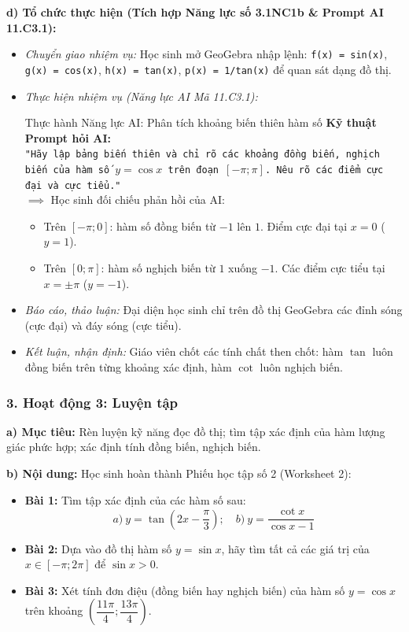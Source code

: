 \documentclass[12pt, a4paper]{article}
\begin{document}
\textbf{d) Tổ chức thực hiện (Tích hợp Năng lực số 3.1NC1b & Prompt AI 11.C3.1):}
\begin{itemize}[leftmargin=0.6cm]
    \item \textit{Chuyển giao nhiệm vụ:} Học sinh mở GeoGebra nhập lệnh: \texttt{f(x) = sin(x)}, \texttt{g(x) = cos(x)}, \texttt{h(x) = tan(x)}, \texttt{p(x) = 1/tan(x)} để quan sát dạng đồ thị.
    \item \textit{Thực hiện nhiệm vụ (Năng lực AI Mã 11.C3.1):}
    \begin{aibox}{Thực hành Năng lực AI: Phân tích khoảng biến thiên hàm số}
        \textbf{Kỹ thuật Prompt hỏi AI:}\\
        \texttt{"Hãy lập bảng biến thiên và chỉ rõ các khoảng đồng biến, nghịch biến của hàm số $y = \cos x$ trên đoạn $[-\pi; \pi]$. Nêu rõ các điểm cực đại và cực tiểu."}\\
        $\implies$ Học sinh đối chiếu phản hồi của AI:
        \begin{itemize}[leftmargin=0.5cm]
            \item Trên $[-\pi; 0]$: hàm số đồng biến từ $-1$ lên $1$. Điểm cực đại tại $x = 0$ ($y = 1$).
            \item Trên $[0; \pi]$: hàm số nghịch biến từ $1$ xuống $-1$. Các điểm cực tiểu tại $x = \pm \pi$ ($y = -1$).
        \end{itemize}
    \end{aibox}
    \item \textit{Báo cáo, thảo luận:} Đại diện học sinh chỉ trên đồ thị GeoGebra các đỉnh sóng (cực đại) và đáy sóng (cực tiểu).
    \item \textit{Kết luận, nhận định:} Giáo viên chốt các tính chất then chốt: hàm $\tan$ luôn đồng biến trên từng khoảng xác định, hàm $\cot$ luôn nghịch biến.
\end{itemize}

\subsubsection*{3. Hoạt động 3: Luyện tập}
\textbf{a) Mục tiêu:} Rèn luyện kỹ năng đọc đồ thị; tìm tập xác định của hàm lượng giác phức hợp; xác định tính đồng biến, nghịch biến.

\textbf{b) Nội dung:} Học sinh hoàn thành Phiếu học tập số 2 (Worksheet 2):
\begin{itemize}[leftmargin=0.6cm]
    \item \textbf{Bài 1:} Tìm tập xác định của các hàm số sau:
    $$a) \ y = \tan\left(2x - \dfrac{\pi}{3}\right); \quad b) \ y = \dfrac{\cot x}{\cos x - 1}$$
    \item \textbf{Bài 2:} Dựa vào đồ thị hàm số $y = \sin x$, hãy tìm tất cả các giá trị của $x \in [-\pi; 2\pi]$ để $\sin x > 0$.
    \item \textbf{Bài 3:} Xét tính đơn điệu (đồng biến hay nghịch biến) của hàm số $y = \cos x$ trên khoảng $\left(\dfrac{11\pi}{4}; \dfrac{13\pi}{4}\right)$.
\end{itemize}
\end{document}
